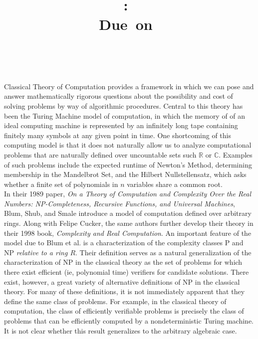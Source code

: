 \documentclass{article}
\title{\vspace{2in}\textmd{\textbf{\hmwkClass:\ \hmwkTitle\ifthenelse{\equal{\hmwkSubTitle}{}}{}{\\\hmwkSubTitle}}}\\\normalsize\vspace{0.1in}\small{Due\ on\ \hmwkDueDate}\\\vspace{0.1in}\large{\textit{\hmwkClassInstructor\ \hmwkClassTime}}\vspace{3in}}
\date{}
\author{\textbf{\hmwkAuthorName}}
\begin{document}
\begin{spacing}{1.1}
  \newpage \hspace{3pt} Classical Theory of Computation provides a
  framework in which we can pose and answer mathematically rigorous
  questions about the possibility and cost of solving problems by way
  of algorithmic procedures.  Central to this theory has been the
  Turing Machine model of computation, in which the memory of of an
  ideal computing machine is represented by an infinitely long tape
  containing finitely many symbols at any given point in time.  One
  shortcoming of this computing model is that it does not naturally
  allow us to analyze computational problems that are naturally
  defined over uncountable sets such $\mathbb{R}$ or $\mathbb{C}$.
  Examples of such problems include the expected runtime of Newton's
  Method, determining membership in the Mandelbrot Set, and the
  Hilbert Nullstellensatz, which asks whether a finite set of
  polynomials in $n$ variables share a common root.  \\

  In their 1989 paper, \emph{On a Theory of Computation and Complexity
    Over the Real Numbers: NP-Completeness, Recursive Functions, and
    Universal Machines}, Blum, Shub, and Smale introduce a model of
  computation defined over arbitrary rings.  Along with Felipe Cucker,
  the same authors further develop their theory in their 1998 book,
  \textit{Complexity and Real Computation}.  An important feature of
  the model due to Blum et al. is a characterization of the complexity
  classes P and NP \emph{relative to a ring $R$}.  Their definition
  serves as a natural generalization of the characterization of NP in
  the classical theory as the set of problems for which there exist
  efficient (ie, polynomial time) verifiers for candidate solutions.
  There exist, however, a great variety of alternative definitions of
  NP in the classical theory.  For many of these definitions, it is
  not immediately apparent that they define the same class of
  problems. For example, in the classical theory of computation, the
  class of efficiently verifiable problems is precisely the class of
  problems that can be efficiently computed by a nondeterministic
  Turing machine.  It is not clear whether this result generalizes
  to the arbitrary algebraic case. \\


\end{spacing}
\end{document}
